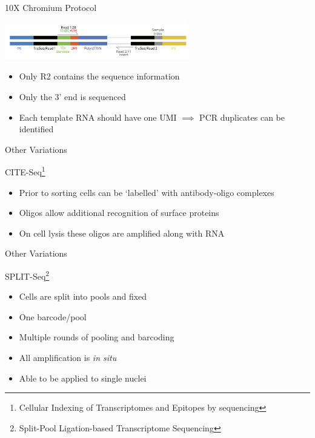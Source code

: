 \documentclass[aspectratio=169,11pt]{beamer}
\begin{document}
\begin{frame}{10X Chromium Protocol}
	\begin{center}
		\includegraphics[width=0.6\textwidth]{figures/10XPairedRead.png} 
	\end{center}
	
	\begin{itemize}
		\item Only R2 contains the sequence information
		\item Only the 3' end is sequenced
		\item Each template RNA should have one UMI $\implies$ PCR duplicates can be identified
	\end{itemize}		
	
\end{frame}

\begin{frame}{Other Variations}

CITE-Seq\footnote{Cellular Indexing of Transcriptomes and Epitopes by sequencing}
	
	\begin{itemize}
		\item Prior to sorting cells can be `labelled' with antibody-oligo complexes
		\item Oligos allow additional recognition of surface proteins
		\item On cell lysis these oligos are amplified along with RNA
	\end{itemize}		
	
\end{frame}

\begin{frame}{Other Variations}

SPLIT-Seq\footnote{Split-Pool Ligation-based Transcriptome Sequencing}
	\begin{itemize}
		\item Cells are split into pools and fixed
		\item One barcode/pool
		\item Multiple rounds of pooling and barcoding
		\item All amplification is \textit{in situ}
		\item Able to be applied to single nuclei
	\end{itemize}
	
\end{frame}
\end{document}
